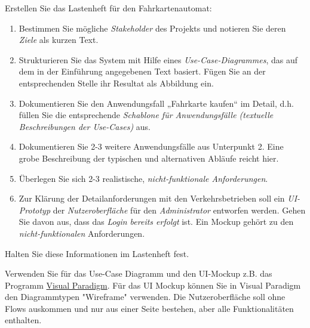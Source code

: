 \documentclass{abgabe}
\begin{document}
\begin{questions}
    Erstellen Sie das Lastenheft für den Fahrkartenautomat:
    \begin{enumerate}
        \item Bestimmen Sie mögliche \emph{Stakeholder} des Projekts und notieren Sie deren \emph{Ziele} als kurzen Text.
        \item Strukturieren Sie das System mit Hilfe eines \emph{Use-Case-Diagrammes}, das auf dem in der Einführung angegebenen Text basiert.
              Fügen Sie an der entsprechenden Stelle ihr Resultat als Abbildung ein.
        \item Dokumentieren Sie den Anwendungsfall „Fahrkarte kaufen“ im Detail, d.h. füllen Sie die entsprechende \emph{Schablone für Anwendungsfälle  (textuelle Beschreibungen der Use-Cases)} aus.
        \item Dokumentieren Sie 2-3 weitere Anwendungsfälle aus Unterpunkt 2. Eine grobe Beschreibung der typischen und alternativen Abläufe reicht hier.
        \item Überlegen Sie sich 2-3 realistische, \emph{nicht-funktionale Anforderungen}.
        \item Zur Klärung der Detailanforderungen mit den Verkehrsbetrieben soll ein \emph{UI-Prototyp} der \emph{Nutzeroberfläche} für den \emph{Administrator} entworfen werden.
              Gehen Sie davon aus, dass das \emph{Login bereits erfolgt} ist.
              Ein Mockup gehört zu den \emph{nicht-funktionalen} Anforderungen.
    \end{enumerate}

    Halten Sie diese Informationen im Lastenheft fest.

    Verwenden Sie für das Use-Case Diagramm und den UI-Mockup z.B. das Programm \href{https://www.ili.fh-aachen.de/ilias.php?baseClass=ilLinkResourceHandlerGUI&ref_id=341847&cmd=calldirectlink}{Visual Paradigm}. Für das UI Mockup können Sie in Visual Paradigm den Diagrammtypen "Wireframe" verwenden.
    Die Nutzeroberfläche soll ohne Flows auskommen und nur aus einer Seite bestehen, aber alle Funktionalitäten enthalten.

    \clearpage

    
\end{questions}
\end{document}
